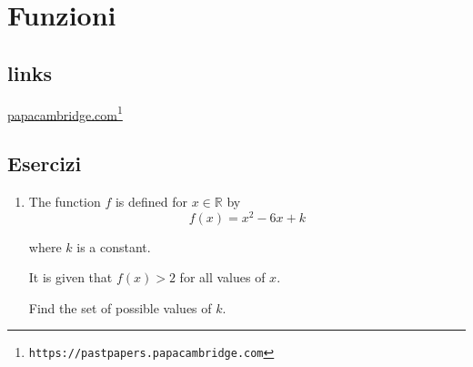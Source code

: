 \section{Funzioni} \label{sec:funzioni}

\subsection{links}


\href{https://pastpapers.papacambridge.com}{papacambridge.com}\footnote{\texttt{https://pastpapers.papacambridge.com}}


\subsection{Esercizi}

\begin{enumerate}
\item  
The function $f$ is defined for $x \in \mathbb{R}$
by 
\[
f(x) = x^2 - 6x + k
\]

where $k$ is a constant.

It is given that $f(x) > 2$ for all values of $x$.

Find the set of possible values of $k$.


\end{enumerate}


